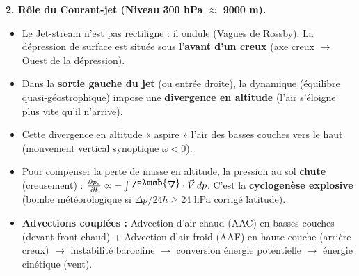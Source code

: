 \documentclass[11pt]{article}
\newcommand{\cle}[1]{{\popxbold\color{popdark}#1}}
\def\nabla{\mathord{\raisebox{\depth}{\scalebox{1}[-1]{$\symup{\Delta}$}}}}%
\begin{document}
\begin{exoresolu}
\textbf{2. Rôle du Courant-jet (Niveau 300 hPa $\approx$ 9000 m).}
\begin{itemize}
    \item Le Jet-stream n'est pas rectiligne : il ondule (\cle{Vagues de Rossby}). La dépression de surface est située sous l'\textbf{avant d'un creux} (axe creux $\to$ Ouest de la dépression).
    \item Dans la \textbf{sortie gauche du jet} (ou entrée droite), la dynamique (équilibre quasi-géostrophique) impose une \textbf{divergence en altitude} (l'air s'éloigne plus vite qu'il n'arrive).
    \item Cette divergence en altitude « aspire » l'air des basses couches vers le haut (mouvement vertical synoptique $\omega < 0$).
    \item Pour compenser la perte de masse en altitude, la pression au sol \textbf{chute} (creusement) : $\frac{\partial p_s}{\partial t} \propto - \int \nabla \cdot \vec{V} \, dp$. C'est la \textbf{cyclogenèse explosive} (bombe météorologique si $\Delta p / 24h \ge 24$ hPa corrigé latitude).
    \item \textbf{Advections couplées :} Advection d'air chaud (AAC) en basses couches (devant front chaud) + Advection d'air froid (AAF) en haute couche (arrière creux) $\to$ instabilité barocline $\to$ conversion énergie potentielle $\to$ énergie cinétique (vent).
\end{itemize}


\end{exoresolu}
\end{document}
